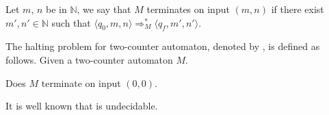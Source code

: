 \begin{definition}
	Let $m$, $n$ be in $\mathbb{N}$, we say that $M$ terminates on input $(m,n)$ if there exist $m',n'\in\mathbb{N}$ such that $\langle q_0,m,n\rangle\Rightarrow^*_M\langle q_f,m',n'\rangle$.
\end{definition}
\begin{definition}
	The halting problem for two-counter automaton, denoted by \autHalt{}, is defined as follows.
	Given a two-counter automaton $M$. 
	\begin{center}
		Does $M$ terminate on input $(0,0)$.
	\end{center}
\end{definition}
It is well known that \autHalt{} is undecidable. %
